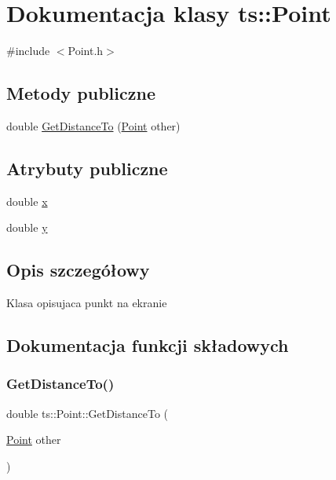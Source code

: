 \hypertarget{classts_1_1_point}{}\section{Dokumentacja klasy ts\+:\+:Point}
\label{classts_1_1_point}


{\ttfamily \#include $<$Point.\+h$>$}

\subsection*{Metody publiczne}
\begin{DoxyCompactItemize}
\item 
double \mbox{\hyperlink{classts_1_1_point_acd9591fcf2e8df803d9713d075e13f42}{Get\+Distance\+To}} (\mbox{\hyperlink{classts_1_1_point}{Point}} other)
\end{DoxyCompactItemize}
\subsection*{Atrybuty publiczne}
\begin{DoxyCompactItemize}
\item 
double \mbox{\hyperlink{classts_1_1_point_ad726f45d332a723ab835926fec22e8b3}{x}}
\item 
double \mbox{\hyperlink{classts_1_1_point_aebe1d290b7b7dac45ac36a42157e5678}{y}}
\end{DoxyCompactItemize}


\subsection{Opis szczegółowy}
Klasa opisujaca punkt na ekranie 

\subsection{Dokumentacja funkcji składowych}
\mbox{\label{classts_1_1_point_acd9591fcf2e8df803d9713d075e13f42}} 
\subsubsection{\texorpdfstring{Get\+Distance\+To()}{GetDistanceTo()}}
{\footnotesize\ttfamily double ts\+::\+Point\+::\+Get\+Distance\+To (\begin{DoxyParamCaption}\item[{\mbox{\hyperlink{classts_1_1_point}{Point}}}]{other }\end{DoxyParamCaption})}

